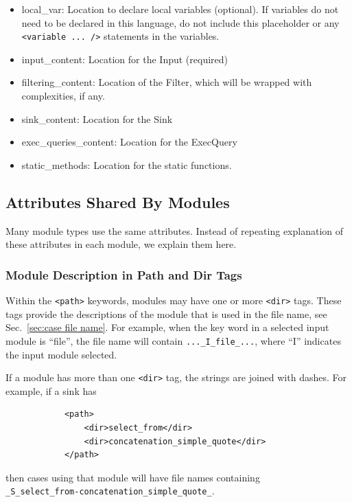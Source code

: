 \begin{itemize}
\begin{itemize}
        \item local\_var: Location to declare local variables (optional).  If
          variables do not need to be declared in this language, do not include this
          placeholder or any \verb|<variable ... />| statements in the variables.

        \item input\_content:  Location for the Input (required)

        \item filtering\_content: Location of the Filter, which will be wrapped with
          complexities, if any.

        \item sink\_content:  Location for the Sink

        \item exec\_queries\_content:  Location for the ExecQuery

        \item static\_methods:  Location for the static functions.
    \end{itemize}
\end{itemize}


\subsection{Attributes Shared By Modules}
\label{sec:shared attributes}

Many module types use the same attributes.  Instead of repeating explanation of
these attributes in each module, we explain them here.

\subsubsection{Module Description in Path and Dir Tags}
\label{sec:module description}

Within the \verb|<path>| keywords, modules may have one or more \verb|<dir>| tags.
These tags provide the descriptions of the module that is used in the file name, see
Sec.~\ref{sec:case file name}.  For example, when the key word in a selected input
module is ``file'', the file name will contain \verb|..._I_file_...|, where ``I''
indicates the input module selected.

If a module has more than one \verb|<dir>| tag, the strings are joined with dashes.
For example, if a sink has
\begin{verbatim}
            <path>
                <dir>select_from</dir>
                <dir>concatenation_simple_quote</dir>
            </path>
\end{verbatim}
then cases using that module will have file names containing \\
\verb|_S_select_from-concatenation_simple_quote_|.

